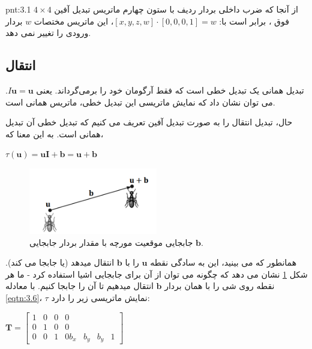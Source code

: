 {\begin{spacing}{1.5}
        \begin{point}{pnt:3.1}
            \Large
            از آنجا که ضرب داخلی بردار ردیف با ستون چهارم ماتریس تبدیل آفین $4\times 4$ فوق ، برابر است با:
            $[x, y, z, w]\cdot[0,0,0,1]=w$، این ماتریس مختصات $w$ بردار ورودی را تغییر نمی دهد.
        \end{point}
    \end{spacing}
}

\subsection{\textbf{انتقال}}
{
    \Large
    \begin{spacing}{1.5}
        تبدیل همانی یک تبدیل خطی است که فقط آرگومان خود را برمی‌گرداند.
        یعنی $I\textbf{u}=\textbf{u}$.
        می توان نشان داد که نمایش ماتریسی این تبدیل خطی، ماتریس همانی است.

        حال، تبدیل انتقال را به صورت تبدیل آفین تعریف می کنیم که تبدیل خطی آن تبدیل همانی است. به این معنا که،

        \begin{center}
            $\tau(\textbf{u})=\textbf{uI}+\textbf{b}=\textbf{u}+\textbf{b}$
        \end{center}

        \begin{figure}[H]
            \centering
            \setlength{\belowcaptionskip}{-10pt}
            \includegraphics[width=0.5\textwidth]{Images/4/3/4.Session.1.3.5}
            \caption {جابجایی موقعیت مورچه با مقدار بردار جابجایی $\textbf{b}$.}
            \label{fig:4.Session.1.3.5}
        \end{figure}

        همانطور که می بینید، این به سادگی نقطه $\textbf{u}$ را با $\textbf{b}$ انتقال میدهد (یا جابجا می کند).
        شکل \ref{fig:4.Session.1.3.5} نشان می دهد که چگونه می توان از آن برای جابجایی اشیا استفاده کرد - ما هر نقطه روی شی را با همان بردار $\textbf{b}$ انتقال میدهیم تا آن را جابجا کنیم.
        با معادله \ref{eqtn:3.6}، $\tau$ نمایش ماتریسی زیر را دارد:

        \begin{center}
            $\textbf{T}=\begin{bmatrix}
                            1 & 0 & 0 & 0 \\
                            0 & 1 & 0 & 0 \\
                            0 & 0 & 1 & 0
                            b_{x} & b_{y} & b_{y} & 1
            \end{bmatrix}$
        \end{center}


\end{spacing}}
